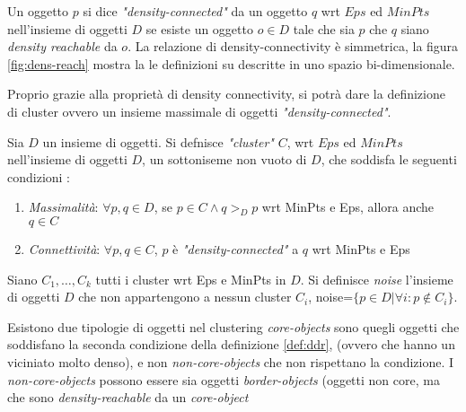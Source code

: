 \begin{definizione}
\label{def:dc}
Un oggetto $p$ si dice 	\emph{"density-connected"} da un oggetto $q$ wrt $Eps$ ed $MinPts$ nell'insieme di oggetti $D$ se esiste un oggetto $o \in D$  tale che sia $p$ che $q$ siano \emph{ density reachable} da $o$. La relazione di density-connectivity è simmetrica, la figura \ref{fig:dens-reach} mostra la le definizioni su descritte in uno spazio bi-dimensionale. 
\end{definizione} 
Proprio grazie alla proprietà di density connectivity, si potrà dare la definizione di cluster ovvero un insieme massimale di oggetti \emph{"density-connected"}.
\begin{definizione}[cluster]
\label{def:cluster}
Sia $D$ un insieme di oggetti.
Si defnisce \emph{"cluster"}  $C$,  wrt $Eps$ ed $MinPts$ nell'insieme di oggetti $D$,
un sottoniseme non vuoto di $D$, che soddisfa le seguenti condizioni :
\begin{enumerate}
\item \emph{Massimalità}: $\forall p,q\in D$, se $p \in C \land q>_{D}p$ wrt MinPts e Eps, 
allora anche $q \in C  $

\item \emph{Connettività}: $\forall p,q\in C$, $p$ è \emph{"density-connected"} a $q$  wrt MinPts e Eps

\end{enumerate}
 
\end{definizione} 


\begin{definizione}[noise]
\label{def:noise}
Siano $C_1,\dots,C_k$ tutti i cluster wrt Eps e MinPts in $D$. Si definisce \emph{noise}  l'insieme di oggetti $D$ che non appartengono a nessun cluster $C_i$,
noise=$\lbrace p\in D | \forall i: p \notin C_i \rbrace $.
 
\end{definizione}
Esistono due tipologie di oggetti nel clustering \emph{core-objects} sono quegli oggetti che soddisfano la seconda condizione della definizione \ref{def:ddr}, (ovvero che hanno un viciniato molto denso), e non \emph{non-core-objects} che non rispettano la condizione. I \emph{non-core-objects} possono essere sia oggetti \emph{border-objects} (oggetti non core, ma che sono \emph{density-reachable} da un \emph{core-object}
 
 





